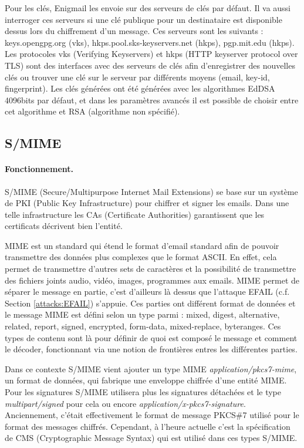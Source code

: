 Pour les clés, Enigmail les envoie sur des serveurs de clés par défaut. Il va aussi interroger ces serveurs si une clé publique pour un destinataire est disponible dessus lors du chiffrement d'un message. Ces serveurs sont les suivants : keys.opengpg.org (vks), hkps.pool.sks-keyservers.net (hkps), pgp.mit.edu (hkps). Les protocoles vks (Verifying Keyservers) et hkps (HTTP keyserver protocol over TLS) sont des interfaces avec des serveurs de clés afin d'enregistrer des nouvelles clés ou trouver une clé sur le serveur par différents moyens (email, key-id, fingerprint). Les clés générées ont été générées avec les algorithmes EdDSA 4096bits par défaut, et dans les paramètres avancés il est possible de choisir entre cet algorithme et RSA (algorithme non spécifié).
\subsection{S/MIME}
\label{protocols:SMIME}
\paragraph*{Fonctionnement.}
S/MIME (Secure/Multipurpose Internet Mail Extensions) se base sur un système de PKI (Public Key Infrastructure) pour chiffrer et signer les emails. Dans une telle infrastructure les CAs (Certificate Authorities) garantissent que les certificats décrivent bien l'entité.

MIME est un standard qui étend le format d'email standard afin de pouvoir transmettre des données plus complexes que le format ASCII. En effet, cela permet de transmettre d'autres sets de caractères et la possibilité de transmettre des fichiers joints audio, vidéo, images, programmes aux emails. MIME permet de séparer le message en partie, c'est d'ailleurs là dessus que l'attaque EFAIL (c.f. Section \ref{attacks:EFAIL}) s'appuie. Ces parties ont différent format de données et le message MIME est défini selon un type parmi : mixed, digest, alternative, related, report, signed, encrypted, form-data, mixed-replace, byteranges. Ces types de contenu sont là pour définir de quoi est composé le message et comment le décoder, fonctionnant via une notion de frontières entres les différentes parties.

Dans ce contexte S/MIME vient ajouter un type MIME \textit{application/pkcs7-mime}, un format de données, qui fabrique une enveloppe chiffrée d'une entité MIME. Pour les signatures S/MIME utilisera plus les signatures détachées et le type \textit{multipart/signed} pour cela ou encore \textit{application/x-pkcs7-signature}. Anciennement, c'était effectivement le format de message PKCS\#7 utilisé pour le format des messages chiffrés. Cependant, à l'heure actuelle c'est la spécification de CMS (Cryptographic Message Syntax) qui est utilisé dans ces types S/MIME.

